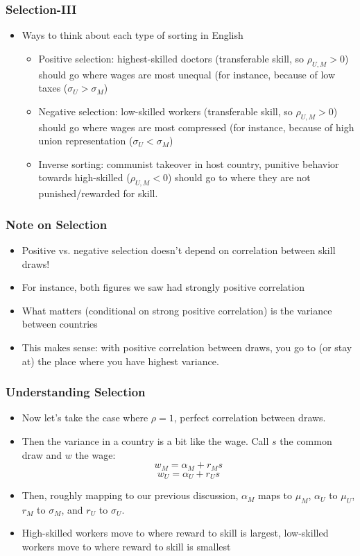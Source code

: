 \documentclass{beamer}
\begin{document}
\begin{frame}
\frametitle{Selection-III}
\begin{itemize}
\item Ways to think about each type of sorting in English
\bigskip
\begin{itemize}
\item Positive selection: highest-skilled doctors (transferable skill, so $\rho_{U,M}>0$) should go where wages are most unequal (for instance, because of low taxes ($\sigma_U>\sigma_M$)
\bigskip
\item Negative selection: low-skilled workers (transferable skill, so $\rho_{U,M}>0$) should go where wages are most compressed (for instance, because of high union representation ($\sigma_U<\sigma_M$)
\bigskip
\item Inverse sorting: communist takeover in host country, punitive behavior towards high-skilled ($\rho_{U,M}<0$) should go to where they are not punished/rewarded for skill. 
\end{itemize}
\end{itemize}
\end{frame}


\begin{frame}
\frametitle{Note on Selection}
\begin{itemize}
\item Positive vs. negative selection doesn't depend on correlation between skill draws!
\bigskip
\item For instance, both figures we saw had strongly positive correlation 
\bigskip
\item What matters (conditional on strong positive correlation) is the variance between countries
\bigskip
\item This makes sense:  with positive correlation between draws, you go to (or stay at) the place where you have highest variance.
\end{itemize}
\end{frame}

\begin{frame}
\frametitle{Understanding Selection}
\begin{itemize}
\item Now let's take the case where $\rho=1$, perfect correlation between draws.
\bigskip
\item Then the variance in a country is a bit like the wage.  Call $s$ the common draw and $w$ the wage:
$$w_M=\alpha_M+r_Ms$$
$$w_U=\alpha_U+r_Us$$
\item Then, roughly mapping to our previous discussion, $\alpha_M$ maps to $\mu_M$, $\alpha_U$ to $\mu_U$, $r_M$ to $\sigma_M$, and $r_U$ to $\sigma_U$.
\bigskip
\item High-skilled workers move to where reward to skill is largest, low-skilled workers move to where reward to skill is smallest
\end{itemize}
\end{frame}
\end{document}

